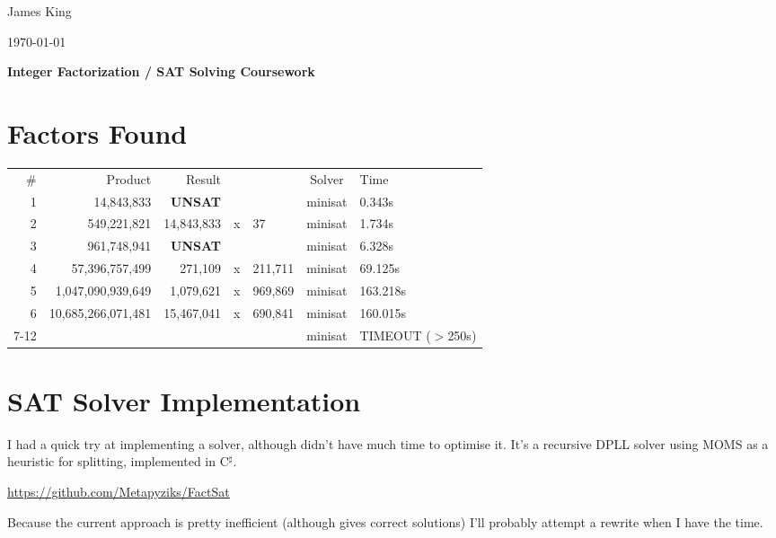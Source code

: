 \documentclass[a4paper,12pt]{article}
\begin{document}
\begin{center}
\begin{minipage}{0.48\textwidth}
\begin{flushleft}
\small{James King}
\vspace{5mm}
\end{flushleft}
\end{minipage}
\begin{minipage}{0.48\textwidth}
\begin{flushright}
\small{\today}
\vspace{5mm}
\end{flushright}
\end{minipage}
\large{\textbf{Integer Factorization / SAT Solving Coursework}}
\end{center}

\section*{Factors Found}
\begin{tabular}{r r rcl c l}
\# & Product & Result & & & Solver & Time \\
1 & 14,843,833 & \textbf{UNSAT} & & & minisat & 0.343s \\
2 & 549,221,821 & 14,843,833 &x& 37 & minisat & 1.734s \\
3 & 961,748,941 & \textbf{UNSAT} & & & minisat & 6.328s \\
4 & 57,396,757,499 & 271,109 &x& 211,711 & minisat & 69.125s \\
5 & 1,047,090,939,649 & 1,079,621 &x& 969,869 & minisat & 163.218s \\
6 & 10,685,266,071,481 & 15,467,041 &x& 690,841 & minisat & 160.015s \\
7-12 & & & & & minisat & TIMEOUT ($>$250s) \\
\end{tabular}

\section*{SAT Solver Implementation}
I had a quick try at implementing a solver, although didn't have much time to optimise it. It's a recursive DPLL solver using MOMS as a heuristic for splitting, implemented in C$^\sharp$.

\vspace{5mm}
\url{https://github.com/Metapyziks/FactSat}

\vspace{5mm}
\noindent
Because the current approach is pretty inefficient (although gives correct solutions) I'll probably attempt a rewrite when I have the time.
\end{document}
